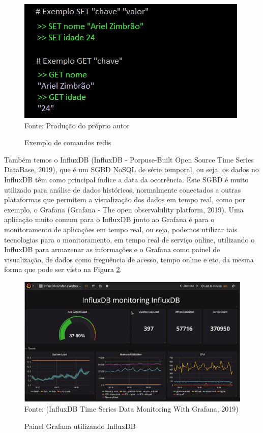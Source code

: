 \documentclass[
	12pt,				%
	openright,			%
	oneside,			%
	a4paper,			%
	chapter=TITLE,		%
	section=TITLE,		%
	subsection=TITLE,	%
	subsubsection=TITLE,%
	english,			%
	brazil				%
	]{abntex2}
\theoremstyle{definition}
\begin{document}
    \begin{figure}[H]
         \centering
         \caption{Exemplo de comandos redis}
         \includegraphics[scale=1]{imagens/exemplo-redis.JPG}
         \\{\footnotesize Fonte: Produção do próprio autor}
         \label{exemplo comandos redis}
    \end{figure}
    
    Também temos o InfluxDB (InfluxDB - Porpuse-Built Open Source Time Series DataBase, 2019), que é um SGBD NoSQL de série temporal, ou seja, os dados no InfluxDB têm  como principal índice a data da ocorrência. Este SGBD é muito utilizado para análise de dados históricos, normalmente conectados a outras plataformas que permitem a visualização dos dados em tempo real, como por exemplo, o Grafana (Grafana - The open observability platform, 2019). Uma aplicação muito comum para o InfluxDB junto 
    ao Grafana é para o monitoramento de aplicações em tempo real, ou seja, podemos utilizar tais tecnologias para o monitoramento, em tempo real de serviço online, utilizando o InfluxDB para armazenar as informações e o Grafana como painel de visualização, de dados como freguência de acesso, tempo online e etc, da mesma forma que pode ser visto na Figura \ref{influxdb com grafana}.

    \begin{figure}[H]
         \centering
         \caption{Painel Grafana utilizando InfluxDB}
         \includegraphics[scale=0.5]{imagens/influx-grafana.jpg}
         \\{\footnotesize Fonte: (InfluxDB Time Series Data Monitoring With Grafana, 2019)}
         \label{influxdb com grafana}
    \end{figure}
\end{document}
